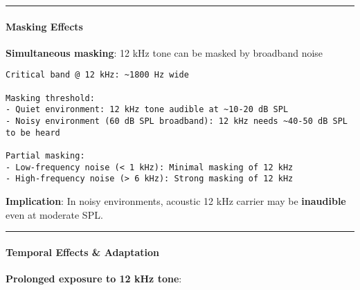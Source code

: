 \begin{center}\rule{0.5\linewidth}{0.5pt}\end{center}

\paragraph{Masking Effects}\label{masking-effects}

\textbf{Simultaneous masking}: 12 kHz tone can be masked by broadband
noise

\begin{verbatim}
Critical band @ 12 kHz: ~1800 Hz wide

Masking threshold:
- Quiet environment: 12 kHz tone audible at ~10-20 dB SPL
- Noisy environment (60 dB SPL broadband): 12 kHz needs ~40-50 dB SPL to be heard

Partial masking:
- Low-frequency noise (< 1 kHz): Minimal masking of 12 kHz
- High-frequency noise (> 6 kHz): Strong masking of 12 kHz
\end{verbatim}

\textbf{Implication}: In noisy environments, acoustic 12 kHz carrier may
be \textbf{inaudible} even at moderate SPL.

\begin{center}\rule{0.5\linewidth}{0.5pt}\end{center}

\paragraph{Temporal Effects \&
Adaptation}\label{temporal-effects-adaptation}

\textbf{Prolonged exposure to 12 kHz tone}:

